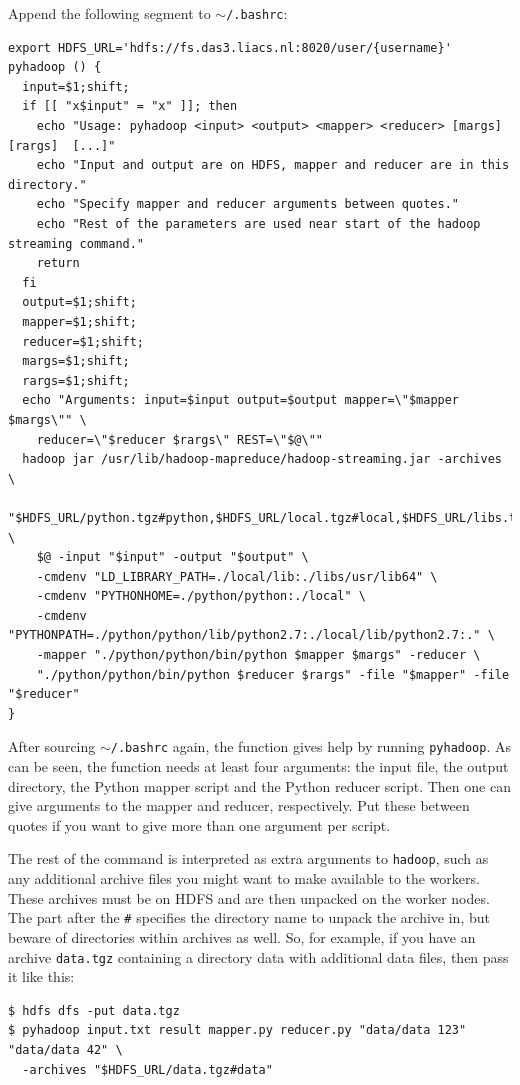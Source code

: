 \documentclass{article}
\begin{document}
Append the following segment to \texttt{$\sim$/.bashrc}:

\begin{verbatim}
export HDFS_URL='hdfs://fs.das3.liacs.nl:8020/user/{username}'
pyhadoop () {
  input=$1;shift;
  if [[ "x$input" = "x" ]]; then
    echo "Usage: pyhadoop <input> <output> <mapper> <reducer> [margs] [rargs]  [...]"
    echo "Input and output are on HDFS, mapper and reducer are in this directory."
    echo "Specify mapper and reducer arguments between quotes."
    echo "Rest of the parameters are used near start of the hadoop streaming command."
    return
  fi
  output=$1;shift;
  mapper=$1;shift;
  reducer=$1;shift;
  margs=$1;shift;
  rargs=$1;shift;
  echo "Arguments: input=$input output=$output mapper=\"$mapper $margs\"" \
    reducer=\"$reducer $rargs\" REST=\"$@\""
  hadoop jar /usr/lib/hadoop-mapreduce/hadoop-streaming.jar -archives \
    "$HDFS_URL/python.tgz#python,$HDFS_URL/local.tgz#local,$HDFS_URL/libs.tgz#libs" \
    $@ -input "$input" -output "$output" \
    -cmdenv "LD_LIBRARY_PATH=./local/lib:./libs/usr/lib64" \
    -cmdenv "PYTHONHOME=./python/python:./local" \
    -cmdenv "PYTHONPATH=./python/python/lib/python2.7:./local/lib/python2.7:." \
    -mapper "./python/python/bin/python $mapper $margs" -reducer \
    "./python/python/bin/python $reducer $rargs" -file "$mapper" -file "$reducer"
}
\end{verbatim}

After sourcing \texttt{$\sim$/.bashrc} again, the function gives help by 
running \texttt{pyhadoop}. As can be seen, the function needs at least four 
arguments: the input file, the output directory, the Python mapper script and 
the Python reducer script. Then one can give arguments to the mapper and 
reducer, respectively. Put these between quotes if you want to give more than 
one argument per script.

The rest of the command is interpreted as extra arguments to \texttt{hadoop}, 
such as any additional archive files you might want to make available to the 
workers. These archives must be on HDFS and are then unpacked on the worker 
nodes. The part after the \texttt{\#} specifies the directory name to unpack 
the archive in, but beware of directories within archives as well. So, for 
example, if you have an archive \texttt{data.tgz} containing a directory data 
with additional data files, then pass it like this:

\begin{verbatim}
$ hdfs dfs -put data.tgz
$ pyhadoop input.txt result mapper.py reducer.py "data/data 123" "data/data 42" \
  -archives "$HDFS_URL/data.tgz#data"
\end{verbatim}
\end{document}
